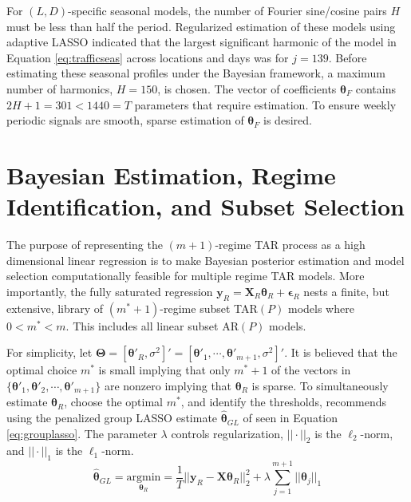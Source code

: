 For $(L,D)$-specific seasonal models, the number of Fourier sine/cosine pairs $H$ must be less than half the period. Regularized estimation of these models using adaptive LASSO \citep{Zou2006} indicated that the largest significant harmonic of the model in Equation \ref{eq:trafficseas} across locations and days was for $j=139$. Before estimating these seasonal profiles under the Bayesian framework, a maximum number of harmonics, $H=150$, is chosen. The vector of coefficients $\bm{\theta}_F$ contains $2H+1=301<1440=T$ parameters that require estimation. To ensure weekly periodic signals are smooth, sparse estimation of $\bm{\theta}_F$ is desired.








\section{Bayesian Estimation, Regime Identification, and Subset Selection}
\label{sec:trafficest}

The purpose of representing the $(m+1)$-regime TAR process as a high dimensional linear regression is to make Bayesian posterior estimation and model selection computationally feasible for multiple regime TAR models. More importantly, the fully saturated regression $\bm{y}_R=\bm{X}_R\bm{\theta}_R+\bm{\epsilon}_R$ nests a finite, but extensive, library of $(m^*+1)$-regime subset TAR$(P)$ models where $0<m^*<m$. This includes all linear subset AR$(P)$ models.

For simplicity, let $\bm{\Theta}=[\bm{\theta}'_R,\sigma^2]'=[\bm{\theta}'_1,\cdots,\bm{\theta}'_{m+1},\sigma^2]'$. It is believed that the optimal choice $m^*$ is small implying that only $m^*+1$ of the vectors in $\{\bm{\theta}'_1,\bm{\theta}'_2,\cdots,\bm{\theta}'_{m+1}\}$ are nonzero implying that $\bm{\theta}_R$ is sparse. To simultaneously estimate $\bm{\theta}_R$, choose the optimal $m^*$, and identify the thresholds, \cite{Chan2015} recommends using the penalized group LASSO estimate $\hat{\bm{\theta}}_{GL}$ of \cite{Yuan2006} seen in Equation \ref{eq:grouplasso}. The parameter $\lambda$ controls regularization, $||\cdot||_2$ is the $\ell_2$-norm, and $||\cdot||_1$ is the $\ell_1$-norm.
\begin{equation}
\label{eq:grouplasso}
\hat{\bm{\theta}}_{GL}=\underset{\bm{\theta}_R}{\textrm{argmin}}=\frac{1}{T}||\bm{y}_R-\bm{X}\bm{\theta}_{R}||_2^2+\lambda\sum\limits_{j=1}^{m+1}||\bm{\theta}_j||_1
\end{equation}


